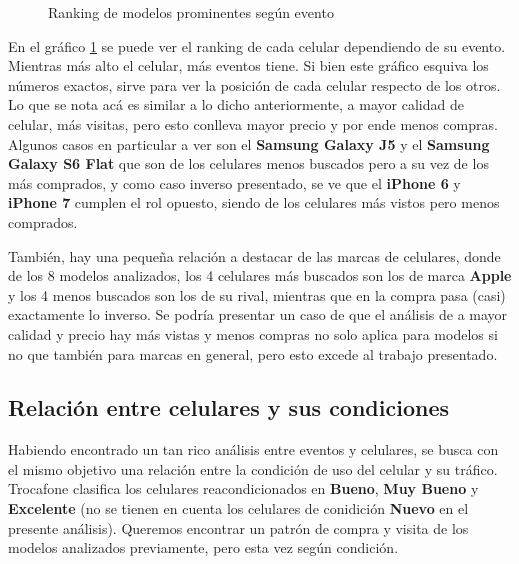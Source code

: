 \documentclass[a4paper]{article}
\begin{document}
\begin{figure}[h!]
	\caption{Ranking de modelos prominentes según evento}
	\label{fig:prominentesrank}
\end{figure}

En el gráfico \ref{fig:prominentesrank} se puede ver el ranking de cada celular dependiendo de su evento. Mientras más alto el celular, más eventos tiene. Si bien este gráfico esquiva los números exactos, sirve para ver la posición de cada celular respecto de los otros. Lo que se nota acá es similar a lo dicho anteriormente, a mayor calidad de celular, más visitas, pero esto conlleva mayor precio y por ende menos compras. Algunos casos en particular a ver son el \textbf{Samsung Galaxy J5} y el \textbf{Samsung Galaxy S6 Flat} que son de los celulares menos buscados pero a su vez de los más comprados, y como caso inverso presentado, se ve que el \textbf{iPhone 6} y \textbf{iPhone 7} cumplen el rol opuesto, siendo de los celulares más vistos pero menos comprados.

También, hay una pequeña relación a destacar de las marcas de celulares, donde de los 8 modelos analizados, los 4 celulares más buscados son los de marca \textbf{Apple} y los 4 menos buscados son los de su rival, mientras que en la compra pasa (casi) exactamente lo inverso. Se podría presentar un caso de que el análisis de a mayor calidad y precio hay más vistas y menos compras no solo aplica para modelos si no que también para marcas en general, pero esto excede al trabajo presentado.

\subsection{Relación entre celulares y sus condiciones}

Habiendo encontrado un tan rico análisis entre eventos y celulares, se busca con el mismo objetivo una relación entre la condición de uso del celular y su tráfico. Trocafone clasifica los celulares reacondicionados en \textbf{Bueno}, \textbf{Muy Bueno} y \textbf{Excelente} (no se tienen en cuenta los celulares de conidición \textbf{Nuevo} en el presente análisis). Queremos encontrar un patrón de compra y visita de los modelos analizados previamente, pero esta vez según condición.
\end{document}
